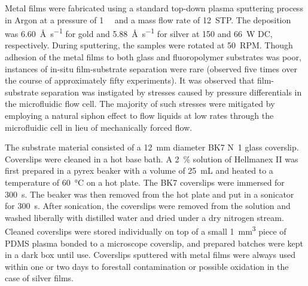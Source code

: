 Metal films were fabricated using a standard top-down plasma sputtering process
in Argon at a pressure of \SI{1}{\milli\torr} and a mass flow rate of
\SI{12}{STP}.  The deposition was \SI{6.60}{\angstrom\per\second} for gold and
\SI{5.88}{\angstrom\per\second} for silver at 150 and \SI{66}{\watt} DC,
respectively.  During sputtering, the samples were rotated at \SI{50}{RPM}.
Though adhesion of the metal films to both glass and fluoropolymer substrates
was poor, instances of in-situ film-substrate separation were rare (observed
five times over the course of approximately fifty experiments).  It was
observed that film-substrate separation was instigated by stresses caused by
pressure differentials in the microfluidic flow cell.  The majority of such
stresses were mitigated by employing a natural siphon effect to flow liquids at
low rates through the microfluidic cell in lieu of mechanically forced flow.


The substrate material consisted of a \SI{12}{\milli\meter} diameter BK7
N~1 glass coverslip.  Coverslips were
cleaned in a hot base bath.  A \SI{2}{\percent} solution of Hellmanex II was
first prepared in a pyrex beaker with a volume of \SI{25}{\milli\liter} and
heated to a temperature of \SI{60}{\celsius} on a hot plate.  The BK7
coverslips were immersed for \SI{300}{\second}.  The beaker was then removed
from the hot plate and put in a sonicator for \SI{300}{\second}.  After
sonication, the coverslips were removed from the solution and washed liberally
with distilled water and dried under a dry nitrogen stream.  Cleaned coverslips
were stored individually on top of a small \SI{1}{\milli\meter\cubed} piece of
PDMS plasma bonded to a microscope coverslip, and prepared batches were kept in
a dark box until use.  Coverslips sputtered with metal films were always used
within one or two days to forestall contamination or possible oxidation in the
case of silver films.


